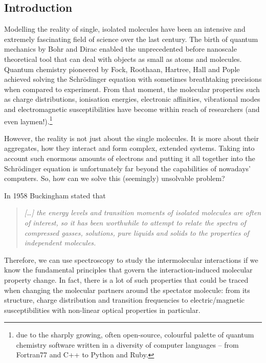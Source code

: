 \documentclass[b5paper,oneside,fleqn,11pt]{book}
\begin{document}
\begin{refsection}
    \fancyhead[RE,LO]{\rightmark}
\chapter{Introduction}

Modelling the reality of single, isolated molecules have been 
an intensive and extremely fascinating field of science over the
last century. The birth of quantum mechanics by Bohr and Dirac enabled the unprecedented
before nanoscale theoretical tool that can deal with objects as small
as atoms and molecules. Quantum chemistry pioneered by Fock, Roothaan, Hartree, Hall
and Pople achieved solving the Schr{\"o}dinger
equation with sometimes breathtaking precisions when compared to experiment.
From that moment, the molecular properties such as charge distributions, ionisation energies,
electronic affinities, vibrational modes and electromagnetic susceptibilities
have become within reach of researchers (and even laymen!).\footnote{due to the
sharply growing, often open-source, colourful palette of quantum chemistry software
written in a diversity of computer languages -- from Fortran77 and C++ to Python and Ruby.} 

However, the reality is not just about the single molecules. It is more about their aggregates,
how they interact and form complex, extended systems. Taking into account such enormous
amounts of electrons and putting it all together into the Schr{\"o}dinger equation 
is unfortunately far beyond the capabilities of nowadays' computers. So, how can we solve this 
(seemingly) unsolvable problem? 

In 1958 Buckingham stated \citep{Buckingham.ProcRSocLondonA.1958} that
%
\begin{quote}
\emph{
[\ldots] the energy levels and transition moments of isolated molecules are often 
of interest, so it has been worthwhile to attempt to relate the spectra of compressed
gasses, solutions, pure liquids and solids to the properties of independent molecules.
}
\end{quote}
%
Therefore, we can use spectroscopy to study the intermolecular interactions
if we know the fundamental principles that govern the interaction\hyp{}induced molecular property
change. In fact, there is a lot of such properties that could be traced when changing
the molecular partners around the spectator molecule: from its
structure, charge distribution and transition frequencies to electric\slash{}magnetic 
susceptibilities with non\hyp{}linear optical properties in particular.


\end{refsection}
\end{document}
